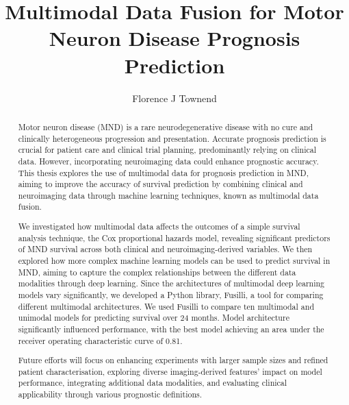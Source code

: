 
\title{Multimodal Data Fusion for Motor Neuron Disease Prognosis Prediction}
\author{Florence J Townend}

\maketitle
\makedeclaration

\begin{abstract} %

    Motor neuron disease (MND) is a rare neurodegenerative disease with no cure and clinically heterogeneous progression and presentation.
    Accurate prognosis prediction is crucial for patient care and clinical trial planning, predominantly relying on clinical data. 
    However, incorporating neuroimaging data could enhance prognostic accuracy.
    This thesis explores the use of multimodal data for prognosis prediction in MND, aiming to improve the accuracy of survival prediction by combining clinical and neuroimaging data through machine learning techniques, known as multimodal data fusion.

    We investigated how multimodal data affects the outcomes of a simple survival analysis technique, the Cox proportional hazards model, revealing significant predictors of MND survival across both clinical and neuroimaging-derived variables.
    We then explored how more complex machine learning models can be used to predict survival in MND, aiming to capture the complex relationships between the different data modalities through deep learning.
    Since the architectures of multimodal deep learning models vary significantly, we developed a Python library, Fusilli, a tool for comparing different multimodal architectures.
    We used Fusilli to compare ten multimodal and unimodal models for predicting survival over 24 months.
    Model architecture significantly influenced performance, with the best model achieving an area under the receiver operating characteristic curve of 0.81.

    Future efforts will focus on enhancing experiments with larger sample sizes and refined patient characterisation, exploring diverse imaging-derived features' impact on model performance, integrating additional data modalities, and evaluating clinical applicability through various prognostic definitions.

\end{abstract}




\setcounter{tocdepth}{2} 

\tableofcontents
\listoffigures
\listoftables


